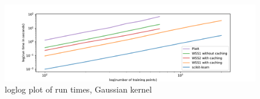 \begin{figure}[h!]
	\includegraphics[width=1\textwidth, center]{benchplot_gauss_loglog.pdf}
	\caption{loglog plot of run times, Gaussian kernel}
	\label{bench_gauss_loglog}
\end{figure}





\newpage